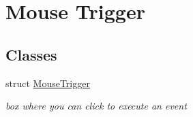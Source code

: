 \hypertarget{group__MouseTrigger}{}\section{Mouse Trigger}
\label{group__MouseTrigger}
\subsection*{Classes}
\begin{DoxyCompactItemize}
\item 
struct \hyperlink{structMouseTrigger}{Mouse\+Trigger}
\begin{DoxyCompactList}\small\item\em box where you can click to execute an event \end{DoxyCompactList}\end{DoxyCompactItemize}
